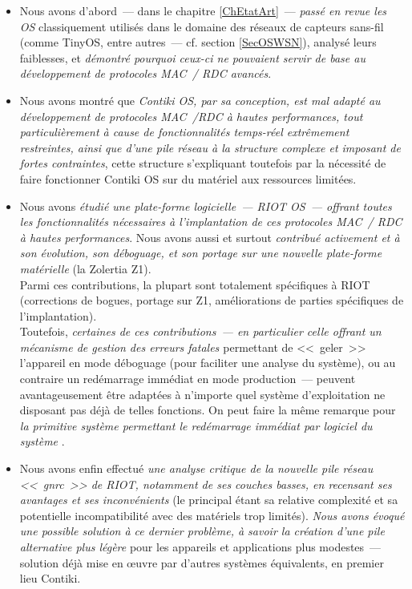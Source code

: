 \begin{itemize}

\item Nous avons d'abord~--- dans le chapitre \ref{ChEtatArt}~---
\emph{passé en revue les OS} classiquement utilisés dans le domaine des
réseaux de capteurs sans-fil (comme TinyOS, entre autres~--- cf. section
\vref{SecOSWSN}), analysé leurs faiblesses, et \emph{démontré pourquoi
ceux-ci ne pouvaient servir de base au développement de protocoles
MAC~/ RDC avancés}.

\item Nous avons montré que \emph{Contiki OS, par sa conception,
est mal adapté au développement de protocoles MAC~/RDC à hautes
performances, tout particulièrement à cause de fonctionnalités temps-réel
extrêmement restreintes, ainsi que d'une pile réseau à la structure complexe
et imposant de fortes contraintes}, cette structure s'expliquant toutefois
par la nécessité de faire fonctionner Contiki OS sur du matériel aux
ressources limitées.

\item Nous avons \emph{étudié une plate-forme logicielle~--- RIOT OS~---
offrant toutes les fonctionnalités nécessaires à l'implantation de
ces protocoles MAC~/ RDC à hautes performances}. Nous avons aussi et
surtout \emph{contribué activement et à son évolution, son déboguage,
et son portage sur une nouvelle plate-forme matérielle}
(la Zolertia Z1). \\
Parmi ces contributions, la plupart sont totalement spécifiques à RIOT
(corrections de bogues, portage sur Z1, améliorations de parties
spécifiques de l'implantation). \\
Toutefois, \emph{certaines de ces contributions~--- en particulier
celle offrant un mécanisme de gestion des erreurs fatales
\cite{PRriotPanic}} permettant de <<~geler~>> l'appareil en mode déboguage
(pour faciliter une analyse  du système), ou au contraire
un redémarrage immédiat en mode production~--- peuvent avantageusement être
adaptées à n'importe quel système d'exploitation ne disposant pas déjà de
telles fonctions. On peut faire la même remarque pour \emph{la primitive
système permettant le redémarrage immédiat par logiciel du système}
\cite{PRriotEnh5}.

\item Nous avons enfin effectué \emph{une analyse critique de la nouvelle
pile réseau <<~gnrc~>> de RIOT, notamment de ses couches basses, en
recensant ses avantages et ses inconvénients} (le principal étant sa
relative complexité et sa potentielle incompatibilité avec des matériels
trop limités). \emph{Nous avons évoqué une possible solution à ce dernier
problème, à savoir la création d'une pile alternative plus légère} pour
les appareils et applications plus modestes~--- solution déjà mise en
{\oe}uvre par d'autres systèmes équivalents, en premier lieu Contiki.

\end{itemize}

